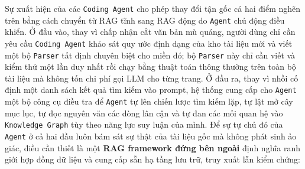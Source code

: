 Sự xuất hiện của các \texttt{Coding Agent} cho phép thay đổi tận gốc cả hai điểm nghẽn trên bằng cách chuyển từ RAG tĩnh sang RAG động do \texttt{Agent} chủ động điều khiển. Ở đầu vào, thay vì chấp nhận cắt văn bản mù quáng, người dùng chỉ cần yêu cầu \texttt{Coding Agent} khảo sát quy ước định dạng của kho tài liệu mới và viết một bộ \texttt{Parser} tất định chuyên biệt cho miền đó; bộ \texttt{Parser} này chỉ cần viết và kiểm thử một lần duy nhất rồi chạy bằng thuật toán thông thường trên toàn bộ tài liệu mà không tốn chi phí gọi LLM cho từng trang. Ở đầu ra, thay vì nhồi cố định một danh sách kết quả tìm kiếm vào prompt, hệ thống cung cấp cho \texttt{Agent} một bộ công cụ điều tra để \texttt{Agent} tự lên chiến lược tìm kiếm lặp, tự lật mở cây mục lục, tự đọc nguyên văn các dòng lân cận và tự đan các mối quan hệ vào \texttt{Knowledge Graph} tùy theo năng lực suy luận của mình. Để sự tự chủ đó của \texttt{Agent} ở cả hai đầu luôn bám sát sự thật của tài liệu gốc mà không phát sinh ảo giác, điều cần thiết là một \textbf{RAG framework đứng bên ngoài} định nghĩa ranh giới hợp đồng dữ liệu và cung cấp sẵn hạ tầng lưu trữ, truy xuất lẫn kiểm chứng:
